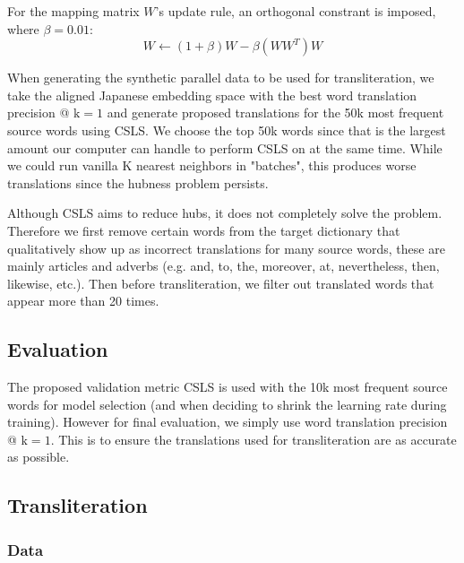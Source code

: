 \documentclass{article}
\begin{document}
For the mapping matrix $W$'s update rule, an orthogonal constrant is imposed, where
$\beta=0.01$:
$$
W \leftarrow (1 + \beta)W - \beta(WW^T)W
$$

When generating the synthetic parallel data to be used for transliteration, we take
the aligned Japanese embedding space with the best word translation precision
@ $\text{k}=1$ and generate proposed translations for the 50k most frequent
source words using CSLS. We choose the top 50k words since that is the largest
amount our computer can handle to perform CSLS on at the same time. While we could
run vanilla K nearest neighbors in "batches", this produces worse translations
since the hubness problem persists.

Although CSLS aims to reduce hubs, it does not completely solve the problem.
Therefore we first remove certain words from the target dictionary that qualitatively
show up as incorrect translations for many source words, these are mainly articles
and adverbs (e.g. and, to, the, moreover, at, nevertheless, then, likewise, etc.).
Then before transliteration, we filter out translated words that appear more than
20 times.

\subsection*{Evaluation}

The proposed validation metric CSLS is used with the 10k most frequent source words
for model selection (and when deciding to shrink the learning rate during training).
However for final evaluation, we simply use word translation precision @
$\text{k}=1$. This is to ensure the translations used for transliteration are as
accurate as possible.

\subsection*{Transliteration}

\subsubsection*{Data}
\end{document}
